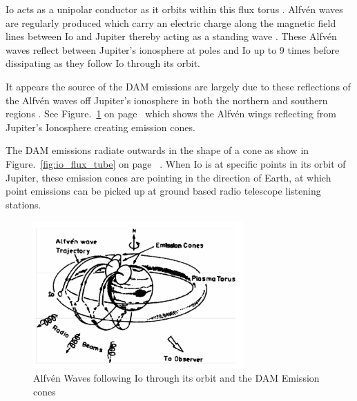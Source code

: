 Io acts as a unipolar conductor as it orbits within this flux torus \citep{bose08}. Alfv\'en waves are regularly produced which carry an electric charge along the magnetic field lines between Io and Jupiter \citep{bose08} thereby acting as a standing wave \citep{bose08}. These Alfv\'en waves reflect between Jupiter's ionosphere at poles and Io up to 9 times \citep{bose08} before dissipating as they follow Io through its orbit. 

It appears the source of the \gls{DAM} emissions are largely due to these reflections of the Alfv\'en waves off Jupiter's ionosphere in both the northern and southern regions \citep{bose08}. See Figure.~\ref{fig:io_plasma_torus} on page~\pageref{fig:io_plasma_torus} which shows the Alfv\'en wings reflecting from Jupiter's Ionosphere creating emission cones.

The \gls{DAM} emissions radiate outwards in the shape of a cone as show in Figure.~\ref{fig:io_flux_tube} on page~\pageref{fig:io_flux_tube} \citep{belcher87}. When Io is at specific points in its orbit of Jupiter, these emission cones are pointing in the direction of Earth, at which point emissions can be picked up at ground based radio telescope listening stations.

%
\begin{figure}[here]
\centering
\includegraphics[width=8cm]{images/04}
\caption{Alfv\'en Waves following Io through its orbit and the DAM Emission cones \citep{bose08}}
\label{fig:io_plasma_torus}
\end{figure}
%

%
%
%

